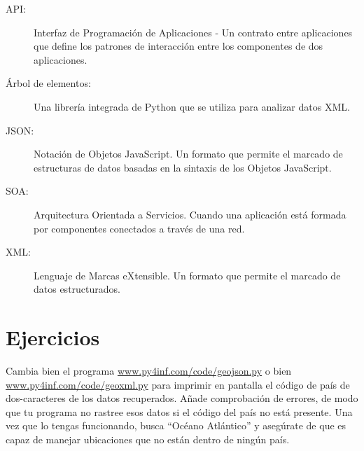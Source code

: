 \begin{description}

\item[API:] Interfaz de Programación de Aplicaciones - Un contrato entre
aplicaciones que define los patrones de interacción entre
los componentes de dos aplicaciones.

\item[Árbol de elementos:] Una librería integrada de Python que se utiliza
para analizar datos XML.

\item[JSON:] Notación de Objetos JavaScript. Un formato que permite
el marcado de estructuras de datos basadas en la sintaxis de los Objetos
JavaScript.

\item[SOA:] Arquitectura Orientada a Servicios. Cuando una aplicación
está formada por componentes conectados a través de una red.

\item[XML:] Lenguaje de Marcas eXtensible. Un formato que permite
el marcado de datos estructurados.

\end{description}

\section{Ejercicios}

\begin{ex}
Cambia bien el programa
\url{www.py4inf.com/code/geojson.py} o bien
\url{www.py4inf.com/code/geoxml.py} para imprimir en pantalla el
código de país de dos-caracteres de los datos recuperados.
Añade comprobación de errores, de modo que tu programa no rastree esos datos
si el código del país no está presente. Una vez que lo tengas
funcionando, busca ``Océano Atlántico'' y asegúrate
de que es capaz de manejar ubicaciones que no están dentro de ningún país.
\end{ex}
